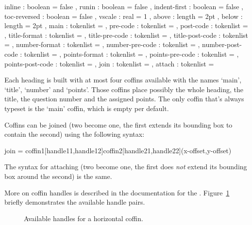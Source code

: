 \documentclass[DIV10,toc=index,toc=bib,numbers=noendperiod]{cnpkgdoc}
\begin{document}
\begin{beispiel}
  {
    inline           : boolean   = false ,
    runin            : boolean   = false ,
    indent-first     : boolean   = false ,
    toc-reversed     : boolean   = false ,
    vscale           : real      = 1     ,
    above            : length    = 2pt   ,
    below            : length    = 2pt   ,
    main             : tokenlist =       ,
    pre-code         : tokenlist =       ,
    post-code        : tokenlist =       ,
    title-format     : tokenlist =       ,
    title-pre-code   : tokenlist =       ,
    title-post-code  : tokenlist =       ,
    number-format    : tokenlist =       ,
    number-pre-code  : tokenlist =       ,
    number-post-code : tokenlist =       ,
    points-format    : tokenlist =       ,
    points-pre-code  : tokenlist =       ,
    points-post-code : tokenlist =       ,
    join             : tokenlist =       ,
    attach           : tokenlist =
  }
\end{beispiel}


Each heading is built with at most four coffins available with the names
`main', `title', `number' and `points'.  Those coffins place possibly the
whole heading, the title, the question number and the assigned points.  The
only coffin that's always typeset is the `main' coffin, which is empty per
default.

Coffins can be joined (two become one, the first extends its bounding box to
contain the second) using the following syntax:
\begin{beispiel}
 join = coffin1[handle11,handle12]coffin2[handle21,handle22](x-offset,y-offset)
\end{beispiel}
The syntax for attaching (two become one, the first does \emph{not} extend its
bounding box around the second) is the same.

More on coffin handles is described in the documentation for the
.  Figure~\ref{fig:handles} briefly demonstrates the available
handle pairs.

\begin{figure}[ht]
 \centering
 \parbox{4.5cm}{%
   \NewCoffin\ExampleCoffin
   \SetHorizontalCoffin\ExampleCoffin{\color{gray!30}\rule{4cm}{4cm}}%
   \DisplayCoffinHandles{}%
 }
 \caption{Available handles for a horizontal coffin.}\label{fig:handles}
\end{figure}
\end{document}
